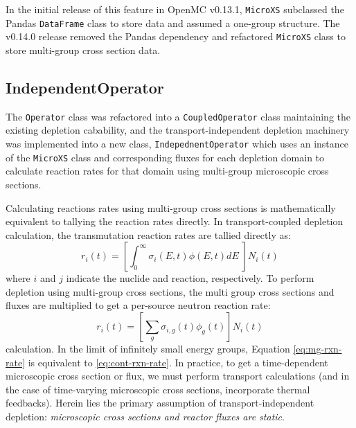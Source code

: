         In the initial release of this feature in OpenMC v0.13.1, \verb.MicroXS.
        subclassed the Pandas \verb.DataFrame. class to store data and assumed a
        one-group structure. The v0.14.0 release removed the Pandas dependency
        and refactored \verb.MicroXS. class to store multi-group cross section
        data.
         
    \subsection{IndependentOperator}
        The \verb.Operator. class was refactored into a \verb.CoupledOperator.
        class maintaining the existing depletion cabability, and the
        transport-independent depletion machinery was implemented into a new
        class, \verb.IndepednentOperator. which uses an instance of the
        \verb.MicroXS. class and corresponding fluxes for each depletion domain
        to calculate reaction rates for that domain using multi-group microscopic
        cross sections.

        Calculating reactions rates using multi-group cross sections is
        mathematically equivalent to tallying the reaction rates directly. In
        transport-coupled depletion calculation, the transmutation reaction
        rates are tallied directly as:
        \begin{equation}
            \label{eq:cont-rxn-rate}
            r_{i}(t) = \left[\int_0^\infty \sigma_i(E,t) \phi(E,t) dE \; \right]
            N_{i}(t)
        \end{equation}
        where $i$ and $j$ indicate the nuclide and reaction, respectively.
            To perform depletion using multi-group cross sections, the multi group
        cross sections and fluxes are multiplied to get a per-source neutron
        reaction rate:
        \begin{equation}
            \label{eq:mg-rxn-rate}
            r_{i}(t) = \left[\sum_{g} \sigma_{i,g}(t) \phi_{g}(t) \right]
            N_{i}(t) 
        \end{equation}
        calculation. In the limit of infinitely small energy groups, Equation
        \ref{eq:mg-rxn-rate} is equivalent to \ref{eq:cont-rxn-rate}. In
        practice, to get a time-dependent microscopic cross section or flux, we
        must perform transport calculations (and in the case of time-varying
        microscopic cross sections, incorporate thermal feedbacks). Herein lies
        the primary assumption of transport-independent depletion: {\it
        microscopic cross sections and reactor fluxes are static}.

